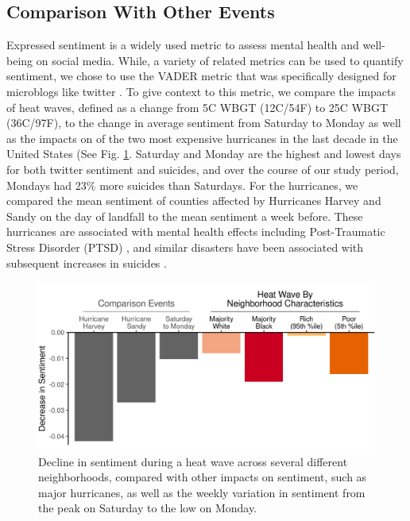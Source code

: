 \documentclass{article}
\begin{document}
\subsection{Comparison With Other Events}

Expressed sentiment is a widely used metric to assess mental health and well-being on social media.  While, a variety of related metrics can be used to quantify sentiment, we chose to use the VADER metric that was specifically designed for microblogs like twitter \cite{hutto2014vader}.  To give context to this metric, we compare the impacts of heat waves, defined as a change from 5\textdegree C WBGT (12\textdegree C/54\textdegree F) to 25\textdegree C WBGT (36\textdegree C/97\textdegree F), to the change in average sentiment from Saturday to Monday as well as the impacts on of the two most expensive hurricanes in the last decade in the United States (See Fig. \ref{fig:compare}.  Saturday and Monday are the highest and lowest days for both twitter sentiment and suicides, and over the course of our study period, Mondays had 23\% more suicides than Saturdays.  For the hurricanes, we compared the mean sentiment of counties affected by Hurricanes Harvey and Sandy on the day of landfall to the mean sentiment a week before.  These hurricanes are associated with mental health effects including Post-Traumatic Stress Disorder (PTSD) \cite{Schwartz2017Aug, Schwartz2018May}, and similar disasters have been associated with subsequent increases in suicides \cite{Krug1998Feb}.

\begin{figure}[H]
  \centering
  \includegraphics[width=\linewidth]{../res/comparison_plot.png}
  \caption{Decline in sentiment during a heat wave across several different neighborhoods, compared with other impacts on sentiment, such as major hurricanes, as well as the weekly variation in sentiment from the peak on Saturday to the low on Monday.}
  \label{fig:compare}
\end{figure}
\end{document}
